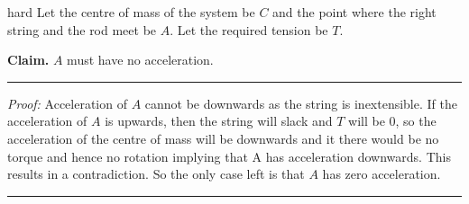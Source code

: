 \begin{solution}{hard}
Let the centre of mass of the system be $C$ and the point where the right string and the rod meet be $A$. Let the required tension be $T$.

\textbf{\textcolor{crimsonglory}{Claim.}} $A$ must have no acceleration.
\begin{center}
\noindent\rule{8cm}{0.4pt}
\end{center}
\textit{Proof:} Acceleration of $A$ cannot be downwards as the string is inextensible. If the acceleration of $A$ is upwards, then the string will slack and $T$ will be 0, so the acceleration of the centre of mass will be downwards and it there would be no torque and hence no rotation implying that A has acceleration downwards. This results in a contradiction. So the only case left is that $A$ has zero acceleration.
\begin{center}
\noindent\rule{8cm}{0.4pt}
\end{center}
\vspace{5mm}


\end{solution}
